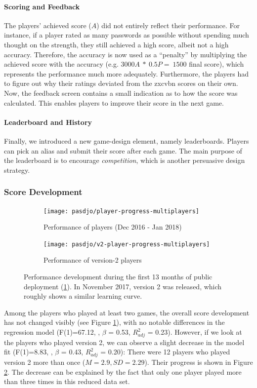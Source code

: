 \paragraph{Scoring and Feedback} The players' achieved score ($A$) did not entirely reflect their performance. For instance, if a player rated as many passwords as possible without spending much thought on the strength, they still achieved a high score, albeit not a high accuracy. Therefore, the accuracy is now used as a ``penalty'' by multiplying the achieved score with the accuracy (e.g. $3000A~*~0.5P=~1500$ final score), which represents the performance much more adequately. Furthermore, the players had to figure out why their ratings deviated from the zxcvbn scores on their own. Now, the feedback screen contains a small indication as to how the score was calculated. This enables players to improve their score in the next game. 

\paragraph{Leaderboard and History} Finally, we introduced a new game-design element, namely leaderboards. Players can pick an alias and submit their score after each game. The main purpose of the leaderboard is to encourage \textit{competition}, which is another persuasive design strategy. 

\subsubsection{Score Development}
\begin{figure}[htbp]
	\begin{subfigure}[t]{0.49\linewidth}
		\texttt{[image: pasdjo/player-progress-multiplayers]}
		\caption{\label{fig:pasdjo:1y-progress}Performance of players (Dec 2016 - Jan 2018)}
	\end{subfigure}
	\begin{subfigure}[t]{0.49\linewidth}
		\texttt{[image: pasdjo/v2-player-progress-multiplayers]}
		\caption{\label{fig:pasdjo:v2-progress}Performance of version-2 players}
	\end{subfigure}
	\caption{\label{fig:pasdjo:v2-progess-comparison} Performance development during the first 13 months of public deployment (\ref{fig:pasdjo:1y-progress}). In November 2017, version 2 was released, which roughly shows a similar learning curve.}
\end{figure}
Among the players who played at least two games, the overall score development has not changed visibly (see Figure \ref{fig:pasdjo:1y-progress}), with no notable differences in the regression model 
(F(1)=67.12, , $\beta$ = 0.53, $R^2_{adj}$ = 0.23). However, if we look at the players who played version 2, we can observe a slight decrease in the model fit (F(1)=8.83, , $\beta$ = 0.43, $R^2_{adj}$ = 0.20): There were 12 players who played version 2 more than once ($M=2.9, SD=2.29$). Their progress is shown in Figure \ref{fig:pasdjo:v2-progress}. The decrease can be explained by the fact that only one player played more than three times in this reduced data set. %

